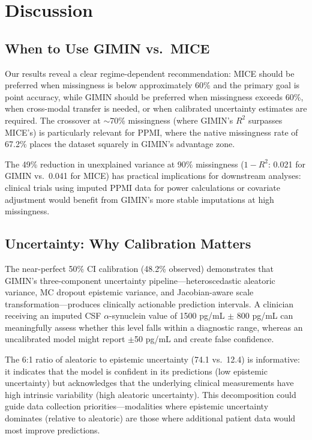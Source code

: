 \documentclass[journal,twoside,web]{ieeecolor}
\begin{document}
\section{Discussion}
\label{sec:discussion}

\subsection{When to Use GIMIN vs.\ MICE}

Our results reveal a clear regime-dependent recommendation: MICE should be preferred when missingness is below approximately 60\% and the primary goal is point accuracy, while GIMIN should be preferred when missingness exceeds 60\%, when cross-modal transfer is needed, or when calibrated uncertainty estimates are required. The crossover at $\sim$70\% missingness (where GIMIN's $R^2$ surpasses MICE's) is particularly relevant for PPMI, where the native missingness rate of 67.2\% places the dataset squarely in GIMIN's advantage zone.

The 49\% reduction in unexplained variance at 90\% missingness ($1 - R^2$: 0.021 for GIMIN vs.\ 0.041 for MICE) has practical implications for downstream analyses: clinical trials using imputed PPMI data for power calculations or covariate adjustment would benefit from GIMIN's more stable imputations at high missingness.

\subsection{Uncertainty: Why Calibration Matters}

The near-perfect 50\% CI calibration (48.2\% observed) demonstrates that GIMIN's three-component uncertainty pipeline---heteroscedastic aleatoric variance, MC dropout epistemic variance, and Jacobian-aware scale transformation---produces clinically actionable prediction intervals. A clinician receiving an imputed CSF $\alpha$-synuclein value of 1500 pg/mL $\pm$ 800 pg/mL can meaningfully assess whether this level falls within a diagnostic range, whereas an uncalibrated model might report $\pm$50 pg/mL and create false confidence.

The 6:1 ratio of aleatoric to epistemic uncertainty (74.1 vs.\ 12.4) is informative: it indicates that the model is confident in its predictions (low epistemic uncertainty) but acknowledges that the underlying clinical measurements have high intrinsic variability (high aleatoric uncertainty). This decomposition could guide data collection priorities---modalities where epistemic uncertainty dominates (relative to aleatoric) are those where additional patient data would most improve predictions.
\end{document}
